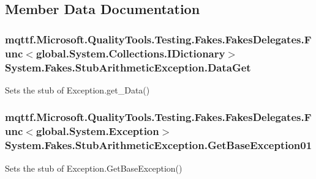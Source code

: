 \subsection{Member Data Documentation}
\hypertarget{class_system_1_1_fakes_1_1_stub_arithmetic_exception_ab3c8d888c76b4d170d66e5696e5e3077}{
\subsubsection[{Data\-Get}]{\setlength{\rightskip}{0pt plus 5cm}mqttf.\-Microsoft.\-Quality\-Tools.\-Testing.\-Fakes.\-Fakes\-Delegates.\-Func$<$global.\-System.\-Collections.\-I\-Dictionary$>$ System.\-Fakes.\-Stub\-Arithmetic\-Exception.\-Data\-Get}}\label{class_system_1_1_fakes_1_1_stub_arithmetic_exception_ab3c8d888c76b4d170d66e5696e5e3077}


Sets the stub of Exception.\-get\-\_\-\-Data()

\hypertarget{class_system_1_1_fakes_1_1_stub_arithmetic_exception_ae8419eac9f874856afedc86b3b845b56}{
\subsubsection[{Get\-Base\-Exception01}]{\setlength{\rightskip}{0pt plus 5cm}mqttf.\-Microsoft.\-Quality\-Tools.\-Testing.\-Fakes.\-Fakes\-Delegates.\-Func$<$global.\-System.\-Exception$>$ System.\-Fakes.\-Stub\-Arithmetic\-Exception.\-Get\-Base\-Exception01}}\label{class_system_1_1_fakes_1_1_stub_arithmetic_exception_ae8419eac9f874856afedc86b3b845b56}


Sets the stub of Exception.\-Get\-Base\-Exception()

